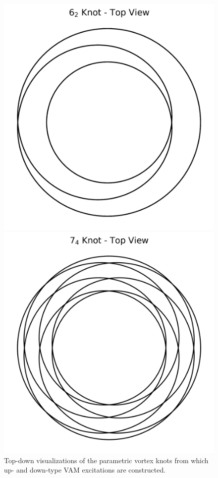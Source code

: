 \begin{figure}[H]
\centering
\begin{minipage}{0.45\textwidth}
    \centering
             \includegraphics[width=\textwidth]{images/knot_6_2_topview.png}
\end{minipage}
\hfill
\begin{minipage}{0.45\textwidth}
    \centering
            \includegraphics[width=\textwidth]{images/knot_7_4_topview.png}
\end{minipage}
     \caption{Top-down visualizations of the parametric vortex knots from which up- and down-type VAM excitations are constructed.}
\end{figure}


